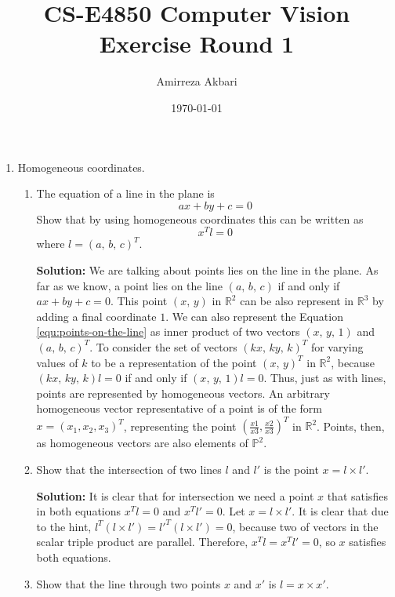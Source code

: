 \documentclass[12pt]{article}
\title{CS-E4850 Computer Vision
\\Exercise Round 1}
\author{Amirreza Akbari}
\date{\today}
\begin{document}
\maketitle
\begin{enumerate}[leftmargin=\labelsep]
\item Homogeneous coordinates.
    \begin{enumerate}
    \item The equation of a line in the plane is
    \begin{equation}\label{equ:points-on-the-line}
        ax + by + c = 0
    \end{equation}
    Show that by using homogeneous coordinates this can be written as
    \begin{equation}
        x^Tl = 0
    \end{equation}
    where $l = (a,\,b,\,c)^T$.
    
    \textbf{Solution:} 
    We are talking about points lies on the line in the plane. As far as we know, a point lies on the line $(a,\,b,\,c)$ if and only if $ax+by+c = 0$. This point $(x,\,y)$ in $\mathbb{R}^2$ can be also represent in $\mathbb{R}^3$ by adding a final coordinate $1$. We can also represent the Equation \ref{equ:points-on-the-line} as inner product of two vectors $(x,\,y,\,1)$ and $(a,\,b,\,c)^T$. To consider the set of vectors $(kx,\,ky,\,k)^T$ for varying values of $k$ to be a representation of the point $(x,\,y)^T$ in $\mathbb{R}^2$, because $(kx,\,ky,\,k)l = 0$ if and only if $(x,\,y,\,1)l = 0$. Thus, just as with lines, points are represented by homogeneous vectors. An arbitrary homogeneous vector representative of a point is of the form $x = (x_1, x_2, x_3)^T$, representing the point $(\frac{x1}{x3}, \frac{x2}{x3})^T$ in $\mathbb{R}^2$. Points, then, as homogeneous vectors are also elements of $\mathbb{P}^2$.
    
    \item  Show that the intersection of two lines $l$ and $l'$ is the point $x = l \times l'$.
    
    \textbf{Solution:} It is clear that for intersection we need a point $x$ that satisfies in both equations $x^Tl = 0$ and $x^Tl' = 0$. Let $x = l \times l'$. It is clear that due to the hint, $l^T(l\times l') = {l'}^T(l \times l') = 0$, because two of vectors in the scalar triple product are parallel. Therefore, $x^T l = x^T l' = 0$, so $x$ satisfies both equations.
    \item  Show that the line through two points $x$ and $x'$ is $l = x \times x'$.
    

\end{enumerate}
\end{enumerate}
\end{document}
